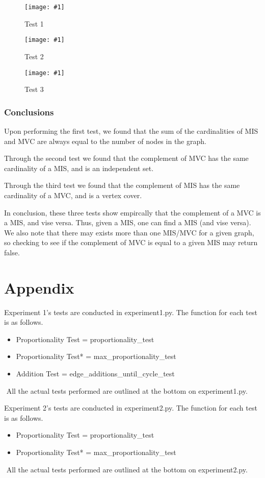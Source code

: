 \documentclass[12pt]{article}
\newcommand{\firgureBuffered}[2]
{
    \begin{figure}[ht!]
        \centering
        \texttt{[image: \#1]}
        \caption{#2}
    \end{figure}
}
\begin{document}
\FloatBarrier{}
\firgureBuffered{images/IndSet/Figure_1.png}{Test 1}
\firgureBuffered{images/IndSet/Figure_2.png}{Test 2}
\firgureBuffered{images/IndSet/Figure_3.png}{Test 3}
\FloatBarrier{}

\subsubsection{Conclusions}
Upon performing the first test, we found that the sum of the cardinalities of MIS and MVC are always equal
to the number of nodes in the graph. 

Through the second test we found that the complement of MVC has the same cardinality of a MIS, and is an independent set.

Through the third test we found that the complement of MIS has the same cardinality of a MVC, and is a vertex cover.

In conclusion, these three tests show empircally that the complement of a MVC is a MIS, and vise versa. Thus, given a MIS, 
one can find a MIS (and vise versa). We also note that there may exists more than one MIS/MVC for a given graph, so checking 
to see if the complement of MVC is equal to a given MIS may return false. 



%
%
%
%
\newpage
\section{Appendix}

Experiment 1's tests are conducted in experiment1.py.
The function for each test is as follows.
\begin{itemize}
    \item Proportionality Test = proportionality\_test\(\)
    \item Proportionality Test* = max\_proportionality\_test\(\)
    \item Addition Test = edge\_additions\_until\_cycle\_test\(\)
\end{itemize}
$ $
\newline
All the actual tests performed are outlined at the bottom on experiment1.py.
\newline
$ $
\newline

Experiment 2's tests are conducted in experiment2.py.
The function for each test is as follows.
\begin{itemize}
    \item Proportionality Test = proportionality\_test\(\)
    \item Proportionality Test* = max\_proportionality\_test\(\)
\end{itemize}
$ $
\newline
All the actual tests performed are outlined at the bottom on experiment2.py.



\end{document}
